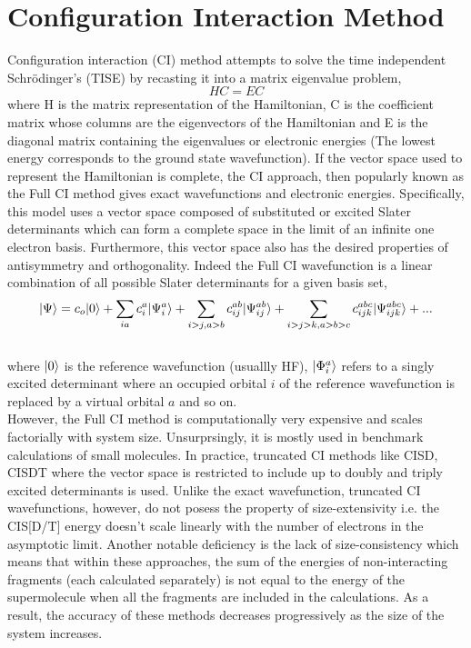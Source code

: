 \section{Configuration Interaction Method}
Configuration interaction (CI) method\cite{SherrillCI98} attempts to solve the time independent 
Schr\"odinger's (TISE) by recasting it into a matrix eigenvalue problem, 
\begin{equation}
HC = EC
\end{equation}
where H is the matrix representation of the Hamiltonian, C is the coefficient matrix
whose columns are the eigenvectors of the Hamiltonian and E is the diagonal matrix 
containing the eigenvalues or electronic energies (The lowest energy corresponds to 
the ground state wavefunction). If the vector space used to represent the Hamiltonian 
is complete, the CI approach, then popularly known as the Full CI method gives exact 
wavefunctions and electronic energies. Specifically, this model uses a vector space 
composed of substituted or excited Slater determinants which can form a complete
space in the limit of an infinite one electron basis. Furthermore, this vector space 
also has the desired properties of antisymmetry and orthogonality. Indeed the Full 
CI wavefunction is a linear combination of all possible Slater determinants for a given basis set,
\\
\begin{equation}
| \Psi \rangle = c_o| 0 \rangle + \sum_{ia}{c}_{i}^{a}| {\Psi}^a_i \rangle + \sum_{i>j,a>b}c_{ij}^{ab}| \Psi^{ab}_{ij} \rangle + \sum_{i>j>k,a>b>c}c_{ijk}^{abc}| \Psi^{abc}_{ijk} \rangle + ...
\end{equation}
\\
where $| 0 \rangle$ is the reference wavefunction (usuallly HF), $| {\Phi}^a_i \rangle$ refers to a singly excited determinant where an occupied orbital $i$ of the reference wavefunction is replaced by a virtual orbital $a$
and so on.\\
However, the Full CI method is computationally very expensive and scales factorially with 
system size. Unsurprsingly, it is mostly used in benchmark calculations of small molecules.
In practice, truncated CI methods like CISD, CISDT where the vector 
space is restricted to include up to doubly and triply excited determinants 
is used. Unlike the exact wavefunction, truncated CI wavefunctions, however, 
do not posess the property of size-extensivity i.e. the CIS[D/T] energy doesn't scale 
linearly with the number of electrons in the asymptotic limit. Another notable deficiency 
is the lack of size-consistency which means that within these approaches, the sum of the 
energies of non-interacting fragments (each calculated separately) is not equal to the energy 
of the supermolecule when all the fragments are included in the calculations.
As a result, the accuracy of these methods decreases progressively as the size of the system increases.
